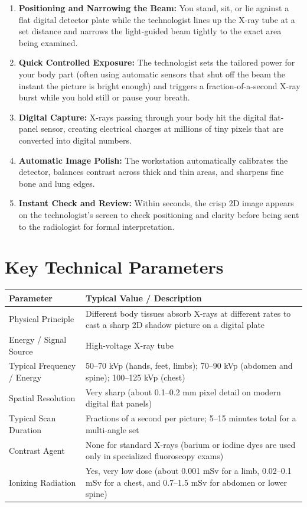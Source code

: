 \begin{enumerate}
    \item \textbf{Positioning and Narrowing the Beam:} You stand, sit, or lie against a flat digital detector plate while the technologist lines up the X-ray tube at a set distance and narrows the light-guided beam tightly to the exact area being examined.
    \item \textbf{Quick Controlled Exposure:} The technologist sets the tailored power for your body part (often using automatic sensors that shut off the beam the instant the picture is bright enough) and triggers a fraction-of-a-second X-ray burst while you hold still or pause your breath.
    \item \textbf{Digital Capture:} X-rays passing through your body hit the digital flat-panel sensor, creating electrical charges at millions of tiny pixels that are converted into digital numbers.
    \item \textbf{Automatic Image Polish:} The workstation automatically calibrates the detector, balances contrast across thick and thin areas, and sharpens fine bone and lung edges.
    \item \textbf{Instant Check and Review:} Within seconds, the crisp 2D image appears on the technologist's screen to check positioning and clarity before being sent to the radiologist for formal interpretation.
\end{enumerate}

\section{Key Technical Parameters}

\noindent
\begin{tabularx}{\textwidth}{@{}l X@{}}
\toprule
\textbf{Parameter} & \textbf{Typical Value / Description} \\
\midrule
Physical Principle & Different body tissues absorb X-rays at different rates to cast a sharp 2D shadow picture on a digital plate \\
Energy / Signal Source & High-voltage X-ray tube \\
Typical Frequency / Energy & 50--70 kVp (hands, feet, limbs); 70--90 kVp (abdomen and spine); 100--125 kVp (chest) \\
Spatial Resolution & Very sharp (about 0.1--0.2 mm pixel detail on modern digital flat panels) \\
Typical Scan Duration & Fractions of a second per picture; 5--15 minutes total for a multi-angle set \\
Contrast Agent & None for standard X-rays (barium or iodine dyes are used only in specialized fluoroscopy exams) \\
Ionizing Radiation & Yes, very low dose (about 0.001 mSv for a limb, 0.02--0.1 mSv for a chest, and 0.7--1.5 mSv for abdomen or lower spine) \\
\bottomrule
\end{tabularx}


